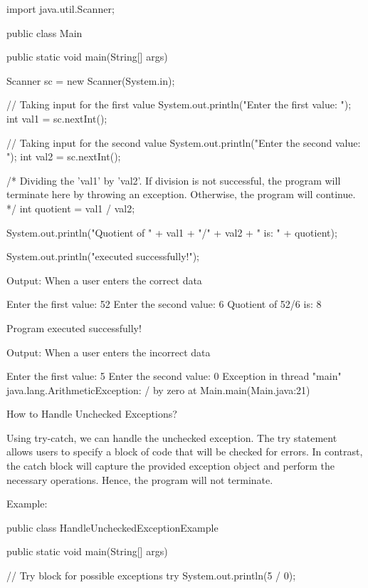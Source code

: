 { 

import java.util.Scanner;

public class Main {

    public static void main(String[] args) {

        Scanner sc = new Scanner(System.in);

        // Taking input for the first value
        System.out.println("Enter the first value: ");
        int val1 = sc.nextInt();

        // Taking input for the second value
        System.out.println("Enter the second value: ");
        int val2 = sc.nextInt();

        /*
        Dividing the 'val1' by 'val2'. If division is not successful, the program will terminate here by throwing an exception.
        Otherwise, the program will continue.
        */
        int quotient = val1 / val2;
        
        System.out.println("Quotient of " + val1 + "/" + val2 + " is: " + quotient);

        System.out.println("\nProgram executed successfully!");
    }
}
 

Output: When a user enters the correct data
 

Enter the first value:
52
Enter the second value:
6
Quotient of 52/6 is: 8

Program executed successfully!
 

Output: When a user enters the incorrect data
 

Enter the first value:
5
Enter the second value:
0
Exception in thread "main" java.lang.ArithmeticException: / by zero
        at Main.main(Main.java:21)
 

 

How to Handle Unchecked Exceptions?
 

Using try-catch, we can handle the unchecked exception. The try statement allows users to specify a block of code that will be checked for errors. In contrast, the catch block will capture the provided exception object and perform the necessary operations. Hence, the program will not terminate.

 

Example:
 

public class HandleUncheckedExceptionExample {

    public static void main(String[] args) {

        // Try block for possible exceptions
        try {
            System.out.println(5 / 0);
        }

}}}
